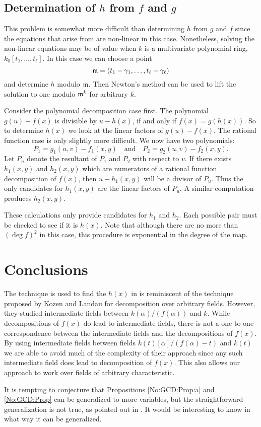 \subsection{Determination of $h$ from $f$ and $g$}
\label{Determine:h:g:Sec}

This problem is somewhat more difficult than determining $h$ from $g$ and $f$
since the equations that arise from  are
non-linear in this case.  Nonetheless, solving the non-linear equations may
be of value when $k$ is a multivariate polynomial ring, $k_0[t_1, \ldots,
t_{\ell}]$.  In this case we can choose a point
\[
{\frak m} = (t_1 - \gamma_1, \ldots, t_{\ell} - \gamma_{\ell})
\]
and determine $h$ modulo ${\frak m}$.  Then Newton's method can be used to
lift the solution to one modulo ${\frak m}^k$ for arbitrary $k$. 

Consider the polynomial decomposition case first.  The polynomial $g(u) -
f(x)$ is divisible by $u- h(x)$, if and only if $f(x) = g(h(x))$.  So to
determine $h(x)$ we look at the linear factors of $g(u) - f(x)$.  The
rational function case is only slightly more difficult.  We now have two
polynomials:
\[
P_1 = g_1(u, v) - f_1(x, y) \quad \mbox{and} \quad
P_2 = g_2(u, v) - f_2(x, y).
\]
Let $P_u$ denote the resultant of $P_1$ and $P_2$ with respect to $v$.  If
there exists $h_1(x,y)$ and $h_2(x,y)$ which are numerators of a rational
function decomposition of $f(x)$, then $u-h_1(x,y)$ will be a divisor of
$P_u$.  Thus the only candidates for $h_1(x,y)$ are the linear factors of
$P_u$.  A similar computation produces $h_2(x,y)$.

These calculations only provide candidates for $h_1$ and $h_2$.  Each
possible pair must be checked to see if it is $h(x)$.  Note that although
there are no more than $(\deg f)^2$ in this case, this procedure is
exponential in the degree of the map.

\section{Conclusions}
\label{Conclusions:Sec}

The technique is used to find the $h(x)$ in  is
reminiscent of the technique proposed by Kozen and Landau
\cite{Kozen89} for decomposition over arbitrary fields.  However, they
studied intermediate fields between $k(\alpha)/(f(\alpha))$ and $k$.  While
decompositions of $f(x)$ do lead to intermediate fields, there is not a one
to one correspondence between the intermediate fields and the
decompositions of $f(x)$.  By using intermediate fields between fields
$k(t)[\alpha]/(f(\alpha)- t)$ and $k(t)$ we are able to avoid much of the
complexity of their approach since any such intermediate field does lead to
decomposition of $f(x)$.  This also allows our approach to work over fields
of arbitrary characteristic.

It is tempting to conjecture that Propositions \ref{No:GCD:Prop:a} and
\ref{No:GCD:Prop} can be generalized to more variables, but the
straightforward generalization is not true, as pointed out in
.  It would be interesting to know in what way it
can be generalized.
